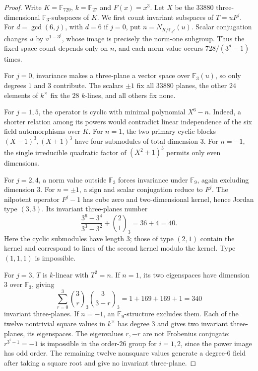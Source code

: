 \begin{proof}
Write $K=\mathbb F_{729}$, $k=\mathbb F_{27}$ and $F(x)=x^3$.
Let $X$ be the $33880$ three-dimensional $\mathbb F_3$-subspaces
of $K$. We first count invariant subspaces of $T=uF^j$. For
$d=\gcd(6,j)$, with $d=6$ if $j=0$, put
$n=N_{K/\mathbb F_{3^d}}(u)$. Scalar conjugation changes $u$ by
$v^{1-3^j}$, whose image is precisely the norm-one subgroup. Thus
the fixed-space count depends only on $n$, and each norm value
occurs $728/(3^d-1)$ times.

For $j=0$, invariance makes a three-plane a vector space over
$\mathbb F_3(u)$, so only degrees $1$ and $3$ contribute.
The scalars $\pm1$ fix all $33880$ planes, the other $24$ elements
of $k^\times$ fix the $28$ $k$-lines, and all others fix none.

For $j=1,5$, the operator is cyclic with minimal polynomial $X^6-n$.
Indeed, a shorter relation among its powers would contradict linear
independence of the six field automorphisms over $K$. For $n=1$,
the two primary cyclic blocks $(X-1)^3,(X+1)^3$ have four submodules
of total dimension $3$. For $n=-1$, the single irreducible quadratic
factor of $(X^2+1)^3$ permits only even dimensions.

For $j=2,4$, a norm value outside $\mathbb F_3$ forces invariance
under $\mathbb F_9$, again excluding dimension $3$. For $n=\pm1$,
a sign and scalar conjugation reduce to $F^j$. The nilpotent
operator $F^j-1$ has cube zero and two-dimensional kernel, hence
Jordan type $(3,3)$. Its invariant three-planes number
\[
 \frac{3^6-3^4}{3^3-3^2}+\binom{2}{1}_{\!3}=36+4=40.
\]
Here the cyclic submodules have length $3$; those of type $(2,1)$
contain the kernel and correspond to lines of the second kernel
modulo the kernel. Type $(1,1,1)$ is impossible.

For $j=3$, $T$ is $k$-linear with $T^2=n$. If $n=1$, its two
eigenspaces have dimension $3$ over $\mathbb F_3$, giving
\[
 \sum_{r=0}^3\binom{3}{r}_{\!3}\binom{3}{3-r}_{\!3}
 =1+169+169+1=340
\]
invariant three-planes. If $n=-1$, an $\mathbb F_9$-structure
excludes them. Each of the twelve nontrivial square values in
$k^\times$ has degree $3$ and gives two invariant three-planes,
its eigenspaces. The eigenvalues $r,-r$ are not Frobenius conjugate:
$r^{3^i-1}=-1$ is impossible in the order-$26$ group for $i=1,2$,
since the power image has odd order. The remaining twelve nonsquare
values generate a degree-$6$ field after taking a square root and
give no invariant three-plane.


\end{proof}
